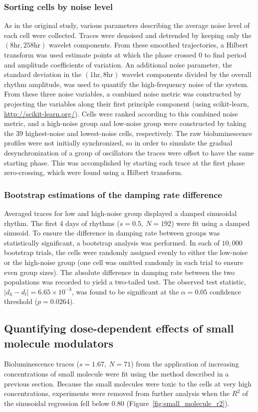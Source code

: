 \documentclass[11pt, letterpaper]{article}
\begin{document}
\subsubsection*{Sorting cells by noise level}
As in the original study, various parameters describing the average noise level of each cell were collected.
Traces were denoised and detrended by keeping only the $(8 \text{hr}, 258 \text{hr})$ wavelet components.
From these smoothed trajectories, a Hilbert transform was used estimate points at which the phase crossed $0$ to find period and amplitude coefficients of variation.
An additional noise parameter, the standard deviation in the $(1 \text{hr}, 8 \text{hr})$ wavelet components divided by the overall rhythm amplitude, was used to quantify the high-frequency noise of the system.
From these three noise variables, a combined noise metric was constructed by projecting the variables along their first principle component (using scikit-learn, \url{http://scikit-learn.org/}).
Cells were ranked according to this combined noise metric, and a high-noise group and low-noise group were constructed by taking the 39 highest-noise and lowest-noise cells, respectively.
The raw bioluminescence profiles were not initially synchronized, so in order to simulate the gradual desynchronization of a group of oscillators the traces were offset to have the same starting phase. 
This was accomplished by starting each trace at the first phase zero-crossing, which were found using a Hilbert transform.

\subsubsection*{Bootstrap estimations of the damping rate difference}
Averaged traces for low and high-noise group displayed a damped sinusoidal rhythm.
The first 4 days of rhythms ($s = 0.5,\ N = 192$) were fit using a damped sinusoid.
To ensure the difference in damping rate between groups was statistically significant, a bootstrap analysis was performed.
In each of $10,000$ bootstrap trials, the cells were randomly assigned evenly to either the low-noise or the high-noise group (one cell was omitted randomly in each trial to ensure even group sizes).
The absolute difference in damping rate between the two populations was recorded to yield a two-tailed test.
The observed test statistic, $|d_h - d_l| = 6.65\times10^{-3}$, was found to be significant at the $\alpha = 0.05$ confidence threshold ($p = 0.0264$).

\subsection*{Quantifying dose-dependent effects of small molecule modulators}
Bioluminescence traces ($s = 1.67,\ N=71$) from the application of increasing concentrations of small molecule were fit using the method described in a previous section.
Because the small molecules were toxic to the cells at very high concentrations, experiments were removed from further analysis when the $R^2$ of the sinusoidal regression fell below $0.80$ (Figure~\ref{fig:small_molecule_r2}).
\end{document}

